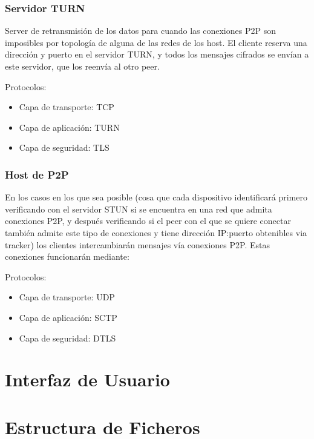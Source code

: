 \documentclass{article}
\begin{document}
    \subsubsection{Servidor TURN}
    Server de retransmisión de los datos para cuando las conexiones P2P son imposibles por topología de alguna de las redes de los host. El cliente reserva una dirección y puerto en el servidor TURN, y todos los mensajes cifrados se envían a este servidor, que los reenvía al otro peer. \vspace{1em}
    
    Protocolos:
    
    \begin{itemize}
       \item Capa de transporte: TCP
       \item Capa de aplicación: TURN
       \item Capa de seguridad: TLS
    \end{itemize}
    
    \subsubsection{Host de P2P}
    En los casos en los que sea posible (cosa que cada dispositivo identificará primero verificando con el servidor STUN si se encuentra en una red que admita conexiones P2P, y después verificando si el peer con el que se quiere conectar también admite este tipo de conexiones y tiene dirección IP:puerto obtenibles via tracker) los clientes intercambiarán mensajes vía conexiones P2P. Estas conexiones funcionarán mediante: \vspace{1em}
    
    Protocolos:
    
    \begin{itemize}
       \item Capa de transporte: UDP
       \item Capa de aplicación: SCTP
       \item Capa de seguridad: DTLS
    \end{itemize}

    \section{Interfaz de Usuario}
    \section{Estructura de Ficheros}
\end{document}
